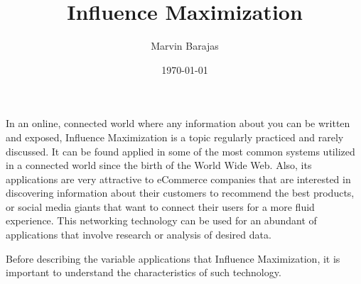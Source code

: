 \documentclass{article}
\title{Influence Maximization}
\author{Marvin Barajas}
\date{\today}			%
\begin{document}
\maketitle			%

In an online, connected world where any information about you can be written and exposed, Influence Maximization is a topic regularly practiced and rarely discussed. 
It can be found applied in some of the most common systems utilized in a connected world since the birth of the World Wide Web. 
Also, its applications are very attractive to eCommerce companies that are interested in discovering information about their customers to recommend the best products, or social media giants that want to connect their users for a more fluid experience. 
This networking technology can be used for an abundant of applications that involve research or analysis of desired data. 

Before describing the variable applications that Influence Maximization, it is important to understand the characteristics of such technology. 


\begin{thebibliography}{99}	%


\cite{9695654} 
\cite{9188557}
\cite{9045797}
\cite{10000698}
\cite{9668587}
\cite{10035644}
\cite{10053447}
\cite{8681423}
\cite{9744500}
\cite{10072595}
\cite{8855546}
\cite{9169627}
\cite{9929315}
\cite{9721514}
\cite{8727988}
\end{thebibliography}
\end{document}
